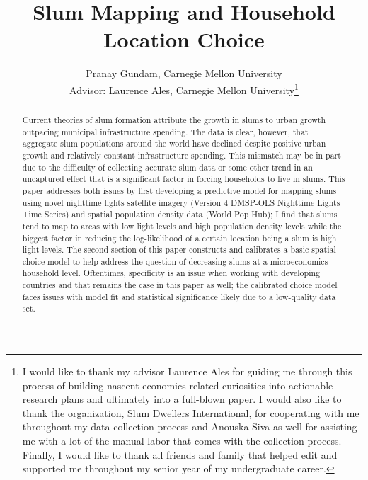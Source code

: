 \documentclass[11pt,english]{article}
\title{\textbf{Slum Mapping and Household Location Choice}}
\author{Pranay Gundam, Carnegie Mellon University \\[1cm]{\small Advisor: Laurence Ales, Carnegie Mellon University\footnote{I would like to thank my advisor Laurence Ales for guiding me through this process of building nascent economics-related curiosities into actionable research plans and ultimately into a full-blown paper. I would also like to thank the organization, Slum Dwellers International, for cooperating with me throughout my data collection process and Anouska Siva as well for assisting me with a lot of the manual labor that comes with the collection process. Finally, I would like to thank all friends and family that helped edit and supported me throughout my senior year of my undergraduate career.}}}
\begin{document}
\maketitle


\begin{abstract}
Current theories of slum formation attribute the growth in slums to urban growth outpacing municipal infrastructure spending. The data is clear, however, that aggregate slum populations around the world have declined despite positive urban growth and relatively constant infrastructure spending. This mismatch may be in part due to the difficulty of collecting accurate slum data or some other trend in an uncaptured effect that is a significant factor in forcing households to live in slums. This paper addresses both issues by first developing a predictive model for mapping slums using novel nighttime lights satellite imagery (Version 4 DMSP-OLS Nighttime Lights Time Series) and spatial population density data (World Pop Hub); I find that slums tend to map to areas with low light levels and high population density levels while the biggest factor in reducing the log-likelihood of a certain location being a slum is high light levels. The second section of this paper constructs and calibrates a basic spatial choice model to help address the question of decreasing slums at a microeconomics household level. Oftentimes, specificity is an issue when working with developing countries and that remains the case in this paper as well; the calibrated choice model faces issues with model fit and statistical significance likely due to a low-quality data set.
\end{abstract}
\newpage


\newpage
\tableofcontents
\newpage























\clearpage




\clearpage



\end{document}
